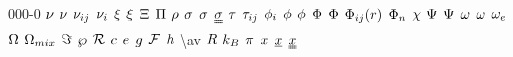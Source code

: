 \begin{mitframe}{000-0}
$\freq$ \newline
$\kinvisc$ \newline
$\stoich$ \newline
$\chargeval$ \newline
$\conjcoortwo$ \newline
$\extent$ \newline
$\gcpf$ \newline
$\osmpress$ \newline
$\dens$ \newline
$\symfac$ \newline
$\molecrad$ \newline
$\stresstens$ \newline
$\torque$ \newline
$\shear$ \newline
$\fhmolefrac{i}$ \newline
$\fugcoeff$ \newline
$\eleccoeff$ \newline
$\pot$ \newline
$\diss$ \newline
$\potfunc$ \newline
$\fftbasis$ \newline
$\fhparam$ \newline
$\streamfunc$ \newline
$\dlesselecpot$ \newline
$\mpf$ \newline
$\accentfac$ \newline
$\elecdegen$ \newline
$\mpc$ \newline
$\combmixfunc$ \newline
$\dof$ \newline
$\dynpress$ \newline
$\surfreac$ \newline
$\lightspeed$ \newline
$\e$ \newline
$\grav$ \newline
$\faraday$ \newline
$\planck$ \newline
  \textbackslash av \newline
$\gasconst$ \newline
$\boltz$ \newline
$\pie$ \newline
$\exscal$ \newline
$\exvecone$ \newline
$\exvectwo$ \newline

\end{mitframe}
